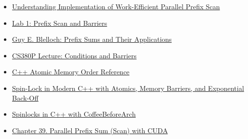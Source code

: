 \documentclass[letterpaper,12pt]{article}
\theoremstyle{remark}
\begin{document}
\begin{itemize}

    \item \href{https://medium.com/nerd-for-tech/understanding-implementation-of-work-efficient-parallel-prefix-scan-cca2d5335c9b}{Understanding Implementation of Work-Efficient Parallel Prefix Scan}
    \item \href{https://www.cs.utexas.edu/~rossbach/cs380p/lab/prefix-sum-pthreads-cs380p.html}{Lab 1: Prefix Scan and Barriers}
    \item \href{https://www.cs.cmu.edu/~guyb/papers/Ble93.pdf}{Guy E. Blelloch: Prefix Sums and Their Applications}
    \item \href{https://www.cs.utexas.edu/~rossbach/cs380p/lectures/06-Conditions+Barriers.pdf}{CS380P Lecture: Conditions and Barriers}
    \item \href{https://en.cppreference.com/w/cpp/atomic/memory_order}{C++ Atomic Memory Order Reference}
    \item \href{https://medium.com/@joao_vaz/spin-lock-in-modern-c-with-atomics-memory-barriers-and-exponential-back-off-522798aca817}{Spin-Lock in Modern C++ with Atomics, Memory Barriers, and Exponential Back-Off}
    \item \href{https://coffeebeforearch.github.io/2020/11/07/spinlocks-6.html}{Spinlocks in C++ with CoffeeBeforeArch}
    \item \href{https://developer.nvidia.com/gpugems/gpugems3/part-vi-gpu-computing/chapter-39-parallel-prefix-sum-scan-cuda}{Chapter 39. Parallel Prefix Sum (Scan) with CUDA}
   \end{itemize}
\end{document}
